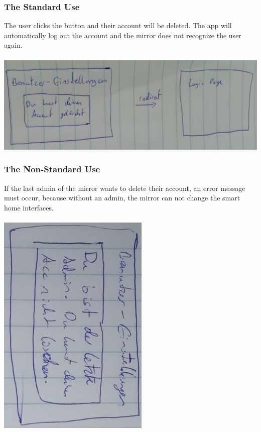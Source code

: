 \documentclass[12pt]{article}
\theoremstyle{definition}
\begin{document}
\subsubsection{The Standard Use}
The user clicks the button and their account will be deleted. The app will automatically log out the account and the mirror does not recognize the user again.\\\\
\includegraphics[angle=90, scale=.3]{UseCase/UIDELETEUSER2.png}\\

\subsubsection{The Non-Standard Use}
If the last admin of the mirror wants to delete their account, an error message must occur, because without an admin, the mirror can not change the smart home interfaces.\\\\
 \includegraphics[angle=90, scale=.5]{UseCase/LetzterAdminWillAccountLoschen.jpeg}\\
\end{document}
